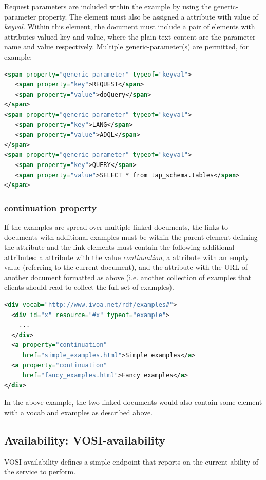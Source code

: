 \documentclass[11pt,letter]{ivoa}
\begin{document}
Request parameters are included within the example by using the
generic-parameter property. The element must also be assigned a
 attribute
with value of \emph{keyval}. Within this element, the document must include a pair of
elements with  attributes valued key and value, where the plain-text content are
the parameter name and value respectively. Multiple generic-parameter(s) are
permitted, for example:

\begin{lstlisting}[language=XML]
<span property="generic-parameter" typeof="keyval">
   <span property="key">REQUEST</span>
   <span property="value">doQuery</span>
</span>
<span property="generic-parameter" typeof="keyval">
   <span property="key">LANG</span>
   <span property="value">ADQL</span>
</span>
<span property="generic-parameter" typeof="keyval">
   <span property="key">QUERY</span>
   <span property="value">SELECT * from tap_schema.tables</span>
</span>
\end{lstlisting}

\subsubsection{continuation property}

If the examples are spread over multiple linked documents, the links to
documents with additional examples must be within the parent element defining
the  attribute and the link elements must contain the following additional
attributes:  a  attribute with the value
\emph{continuation}, a 
attribute with an empty value (referring to the current document), and
the 
attribute with the URL of another document formatted as above (i.e. another
collection of examples that clients should read to collect the full set of
examples).

\begin{lstlisting}[language=XML,basicstyle=\footnotesize]
<div vocab="http://www.ivoa.net/rdf/examples#">
  <div id="x" resource="#x" typeof="example">
    ...
  </div>
  <a property="continuation"
     href="simple_examples.html">Simple examples</a>
  <a property="continuation"
     href="fancy_examples.html">Fancy examples</a>
</div>
\end{lstlisting}

In the above example, the two linked documents would also contain some element
with a vocab and examples as described above.

\subsection{Availability: VOSI-availability}
\label{sec:vosi-availability}
VOSI-availability \citep{2017ivoa.spec.0524G} defines a simple endpoint that
reports on the current ability of the service to perform.
\end{document}
